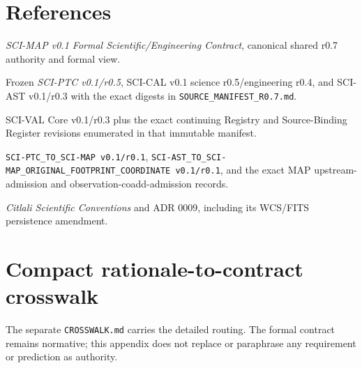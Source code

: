 \documentclass[10pt]{article}
\newcommand{\code}[1]{\nolinkurl{#1}}
\begin{document}
\section*{References}
\begin{enumerate}[label={[\arabic*]},leftmargin=*]
\item \emph{SCI-MAP v0.1 Formal Scientific/Engineering Contract}, canonical shared r0.7 authority and formal view.
\item Frozen \emph{SCI-PTC v0.1/r0.5}, SCI-CAL v0.1 science r0.5/engineering r0.4, and SCI-AST v0.1/r0.3 with the exact digests in \code{SOURCE_MANIFEST_R0.7.md}.
\item SCI-VAL Core v0.1/r0.3 plus the exact continuing Registry and Source-Binding Register revisions enumerated in that immutable manifest.
\item \code{SCI-PTC_TO_SCI-MAP v0.1/r0.1},
\code{SCI-AST_TO_SCI-MAP_ORIGINAL_FOOTPRINT_COORDINATE v0.1/r0.1}, and the
exact MAP upstream-admission and observation-coadd-admission records.
\item \emph{Citlali Scientific Conventions} and ADR 0009, including its WCS/FITS persistence amendment.
\end{enumerate}

\clearpage\appendix
\section{Compact rationale-to-contract crosswalk}\label{app:crosswalk}
The separate \code{CROSSWALK.md} carries the detailed
routing. The formal contract remains normative; this appendix does not replace
or paraphrase any requirement or prediction as authority.
\end{document}
